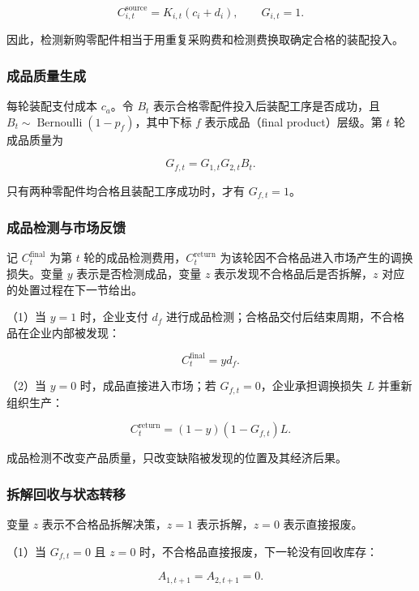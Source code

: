 \documentclass{cumcm}
\numberwithin{figure}{section}
\numberwithin{table}{section}
\begin{document}
\[
C_{i,t}^{\mathrm{source}}=K_{i,t}(c_i+d_i),
\qquad G_{i,t}=1.
\]

因此，检测新购零配件相当于用重复采购费和检测费换取确定合格的装配投入。

\subsubsection{成品质量生成}\label{ux6210ux54c1ux8d28ux91cfux751fux6210}

每轮装配支付成本 \(c_a\)。令 \(B_t\) 表示合格零配件投入后装配工序是否成功，且 \(B_t\sim\operatorname{Bernoulli}(1-p_f)\)，其中下标 \(f\) 表示成品（final product）层级。第 \(t\) 轮成品质量为

\[
G_{f,t}=G_{1,t}G_{2,t}B_t.
\]

只有两种零配件均合格且装配工序成功时，才有 \(G_{f,t}=1\)。

\subsubsection{成品检测与市场反馈}\label{ux6210ux54c1ux68c0ux6d4bux4e0eux5e02ux573aux53cdux9988}

记 \(C_t^{\mathrm{final}}\) 为第 \(t\) 轮的成品检测费用，\(C_t^{\mathrm{return}}\) 为该轮因不合格品进入市场产生的调换损失。变量 \(y\) 表示是否检测成品，变量 \(z\) 表示发现不合格品后是否拆解，\(z\) 对应的处置过程在下一节给出。

（1）当 \(y=1\) 时，企业支付 \(d_f\) 进行成品检测；合格品交付后结束周期，不合格品在企业内部被发现：

\[
C_t^{\mathrm{final}}=yd_f.
\]

（2）当 \(y=0\) 时，成品直接进入市场；若 \(G_{f,t}=0\)，企业承担调换损失 \(L\) 并重新组织生产：

\[
C_t^{\mathrm{return}}=(1-y)(1-G_{f,t})L.
\]

成品检测不改变产品质量，只改变缺陷被发现的位置及其经济后果。

\subsubsection{拆解回收与状态转移}\label{ux62c6ux89e3ux56deux6536ux4e0eux72b6ux6001ux8f6cux79fb}

变量 \(z\) 表示不合格品拆解决策，\(z=1\) 表示拆解，\(z=0\) 表示直接报废。

（1）当 \(G_{f,t}=0\) 且 \(z=0\) 时，不合格品直接报废，下一轮没有回收库存：

\[
A_{1,t+1}=A_{2,t+1}=0.
\]
\end{document}
